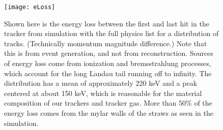 \begin{figure}[]
\caption{Shown here is the energy loss between the first and last hit in the tracker from simulation with the full physics list for a distribution of tracks. (Technically momentum magnitude difference.) Note that this is from event generation, and not from reconstruction. Sources of energy loss come from ionization and bremsstrahlung processes, which account for the long Landau tail running off to infinity. The distribution has a mean of approximately 220 keV and a peak centered at about 150 keV, which is reasonable for the material composition of our trackers and tracker gas. More than 50\% of the energy loss comes from the mylar walls of the straws as seen in the simulation.}
\centering
\texttt{[image: eLoss]}
\label{fig:eLoss}
\end{figure}
